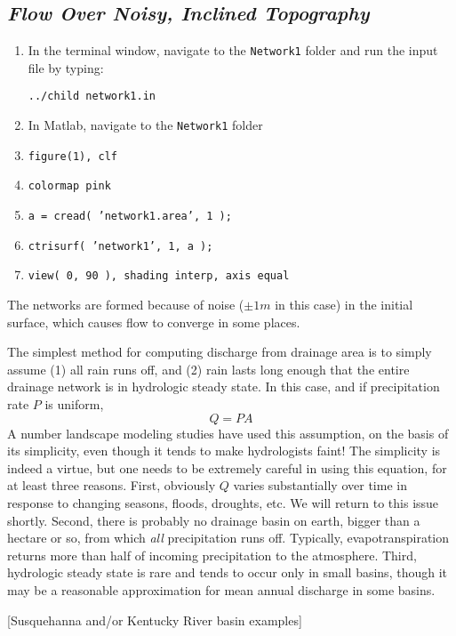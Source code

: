 \documentclass[12pt]{amsart}
\begin{document}
\bigskip
\subsection*{\em Flow Over Noisy, Inclined Topography}

{\em
\begin{enumerate}
\item
In the terminal window, navigate to the {\tt Network1} folder and run the input file by typing:

{\tt ../child network1.in}
\item
In Matlab, navigate to the {\tt Network1} folder
\item
{\tt figure(1), clf}
\item
{\tt colormap pink}
\item
{\tt a = cread( 'network1.area', 1 );}
\item
{\tt ctrisurf( 'network1', 1, a );}
\item
{\tt view( 0, 90 ), shading interp, axis equal}
\end{enumerate}

The networks are formed because of noise ($\pm1m$ in this case) in the initial surface, which causes flow to converge in some places.
}

\medskip

The simplest method for computing discharge from drainage area is to simply assume (1) all rain runs off, and (2) rain lasts long enough that the entire drainage network is in hydrologic steady state. In this case, and if precipitation rate $P$ is uniform,
\begin{equation}
Q = PA
\end{equation}
A number landscape modeling studies have used this assumption, on the basis of its simplicity, even though it tends to make hydrologists faint! The simplicity is indeed a virtue, but one needs to be extremely careful in using this equation, for at least three reasons. First, obviously $Q$ varies substantially over time in response to changing seasons, floods, droughts, etc. We will return to this issue shortly. Second, there is probably no drainage basin on earth, bigger than a hectare or so, from which {\em all} precipitation runs off. Typically, evapotranspiration returns more than half of incoming precipitation to the atmosphere. Third, hydrologic steady state is rare and tends to occur only in small basins, though it may be a reasonable approximation for mean annual discharge in some basins.

[Susquehanna and/or Kentucky River basin examples]
\end{document}

